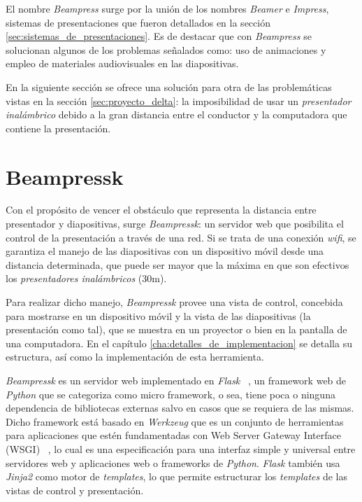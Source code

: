 		El nombre \textit{Beampress} surge por la unión de los nombres \textit{Beamer} e \textit{Impress}, sistemas de presentaciones que fueron detallados en la sección \ref{sec:sistemas_de_presentaciones}. Es de destacar que con \textit{Beampress} se solucionan algunos de los problemas señalados como: uso de animaciones y empleo de materiales audiovisuales en las diapositivas.	

	En la siguiente sección se ofrece una solución para otra de las problemáticas vistas en la sección \ref{sec:proyecto_delta}: la imposibilidad de usar un \textit{presentador inalámbrico} debido a la gran distancia entre el conductor y la computadora que contiene la presentación.
	
	\section{Beampressk} %
	\label{sec:beampressk}
		Con el propósito de vencer el obstáculo que representa la distancia entre presentador y diapositivas, surge \textit{Beampressk}: un servidor web que posibilita el control de la presentación a través de una red. Si se trata de una conexión \textit{wifi}, se garantiza el manejo de las diapositivas con un dispositivo móvil desde una distancia determinada, que puede ser mayor que la máxima en que son efectivos los \textit{presentadores inalámbricos} (30m).

		Para realizar dicho manejo, \textit{Beampressk} provee una vista de control, concebida para mostrarse en un dispositivo móvil y la vista de las diapositivas (la presentación como tal), que se muestra en un proyector o bien en la pantalla de una computadora. En el capítulo \ref{cha:detalles_de_implementacion} se detalla su estructura, así como la implementación de esta herramienta.

		\textit{Beampressk} es un servidor web implementado en \textit{Flask} ~\cite{flask}, un framework web de \textit{Python} que se categoriza como micro framework, o sea, tiene poca o ninguna dependencia de bibliotecas externas salvo en casos que se requiera de las mismas. Dicho framework está basado en \textit{Werkzeug} que es un conjunto de herramientas para aplicaciones que estén fundamentadas con Web Server Gateway Interface (WSGI) ~\cite{wsgi}, lo cual es una especificación para una interfaz simple y universal entre servidores web y aplicaciones web o frameworks de \textit{Python}. \textit{Flask} también usa \textit{Jinja2} como motor de \textit{templates}, lo que permite estructurar los \textit{templates} de las vistas de control y presentación.



